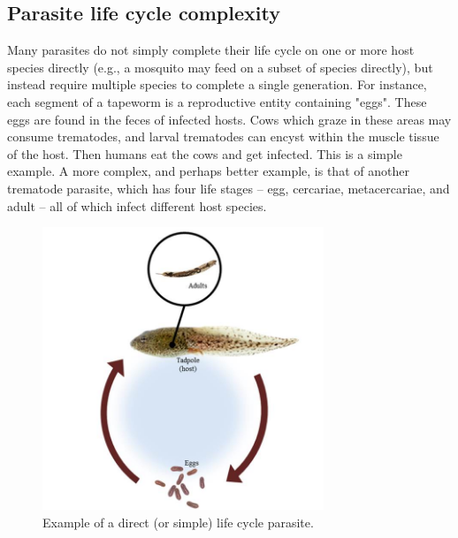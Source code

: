 \documentclass[12pt]{article}
\begin{document}
\bigskip

\subsection*{Parasite life cycle complexity}

Many parasites do not simply complete their life cycle on one or more host species directly (e.g., a mosquito may feed on a subset of species directly), but instead require multiple species to complete a single generation. For instance, each segment of a tapeworm is a reproductive entity containing "eggs". These eggs are found in the feces of infected hosts. Cows which graze in these areas may consume trematodes, and larval trematodes can encyst within the muscle tissue of the host. Then humans eat the cows and get infected. This is a simple example. A more complex, and perhaps better example, is that of another trematode parasite, which has four life stages -- egg, cercariae, metacercariae, and adult -- all of which infect different host species. 




\begin{figure}
\includegraphics[width=0.75\textwidth]{figs/DirectLifeCycle.jpg}
\caption{Example of a direct (or simple) life cycle parasite.}
\end{figure}
\end{document}
